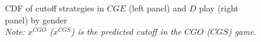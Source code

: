 \documentclass[12pt,english]{article}
\begin{document}
\begin{center}
\begin{figure}[ht]
\centering{}%
\begin{minipage}[t]{0.45\columnwidth}%
%
\end{minipage}%
\begin{minipage}[t]{0.45\columnwidth}%
%
\end{minipage} 
\caption{CDF of cutoff strategies in $CGE$ (left panel) and $D$ play (right panel) by gender\\ \footnotesize{\textit{Note: $x^{CGO}$ ($x^{CGS}$) is the predicted cutoff in the $CGO$ ($CGS$) game.}}}
\label{fig:cdfgender2}\end{figure}
\par\end{center}
\end{document}
